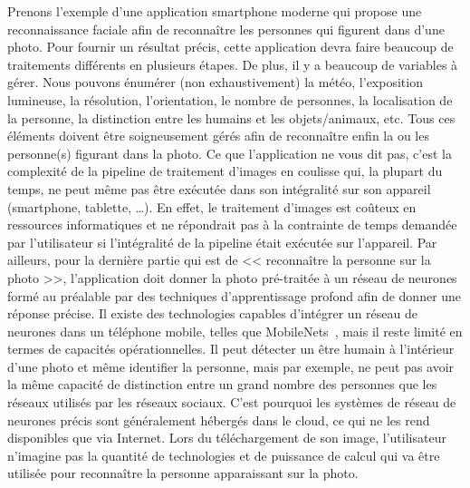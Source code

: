 Prenons l'exemple d'une application smartphone moderne qui propose une reconnaissance faciale afin de reconnaître les
personnes qui figurent dans d'une photo. Pour fournir un résultat précis, cette application devra faire beaucoup de
traitements différents en plusieurs étapes. De plus, il y a beaucoup de variables à gérer. Nous pouvons énumérer (non
exhaustivement) la météo, l'exposition lumineuse, la résolution, l'orientation, le nombre de personnes, la localisation
de la personne, la distinction entre les humains et les objets/animaux, etc. Tous ces éléments doivent être
soigneusement gérés afin de reconnaître enfin la ou les personne(s) figurant dans la photo. Ce que l'application ne vous
dit pas, c'est la complexité de la pipeline de traitement d'images en coulisse qui, la plupart du temps, ne peut même
pas être exécutée dans son intégralité sur son appareil (smartphone, tablette, \ldots). En effet, le traitement d'images
est coûteux en ressources informatiques et ne répondrait pas à la contrainte de temps demandée par l'utilisateur si
l'intégralité de la pipeline était exécutée sur l'appareil. Par ailleurs, pour la dernière partie qui est de <<
reconnaître la personne sur la photo >>, l'application doit donner la photo pré-traitée à un réseau de neurones formé au
préalable par des techniques d'apprentissage profond afin de donner une réponse précise. Il existe des technologies
capables d'intégrer un réseau de neurones dans un téléphone mobile, telles que
MobileNets~\parencite{howard.2017.mobilenets}, mais il reste limité en termes de capacités opérationnelles. Il peut
détecter un être humain à l'intérieur d'une photo et même identifier la personne, mais par exemple, ne peut pas avoir la
même capacité de distinction entre un grand nombre des personnes que les réseaux utilisés par les réseaux sociaux. C'est
pourquoi les systèmes de réseau de neurones précis sont généralement hébergés dans le cloud, ce qui ne les rend
disponibles que via Internet. Lors du téléchargement de son image, l'utilisateur n'imagine pas la quantité de
technologies et de puissance de calcul qui va être utilisée pour reconnaître la personne apparaissant sur la photo.


